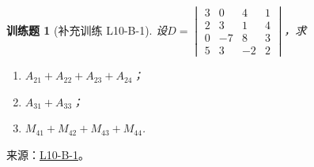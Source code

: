 \documentclass[UTF8,12pt,a4paper,fontset=fandol]{ctexart}
\newtheorem{exercise}{训练题}[section]
\begin{document}
\begin{exercise}[补充训练 L10-B-1]\label{prob:L10-B-1}
设$D=\begin{vmatrix}
                3 & 0 & 4 & 1 \\ 2 & 3 & 1 & 4 \\ 0 & -7 & 8 & 3 \\ 5 & 3 & -2 & 2
            \end{vmatrix}$，求
        \begin{enumerate}
            \item $A_{21}+A_{22}+A_{23}+A_{24}$；

            \item $A_{31}+A_{33}$；

            \item $M_{41}+M_{42}+M_{43}+M_{44}$.
        \end{enumerate}
\end{exercise}
\noindent 来源：\href{https://github.com/yhwu-is/Linear-Algebra-Left-Undone/blob/new/%E8%AE%B2%E4%B9%89/%E4%B8%93%E9%A2%98/10%20%E8%A1%8C%E5%88%97%E5%BC%8F.tex}{L10-B-1}。
\end{document}
